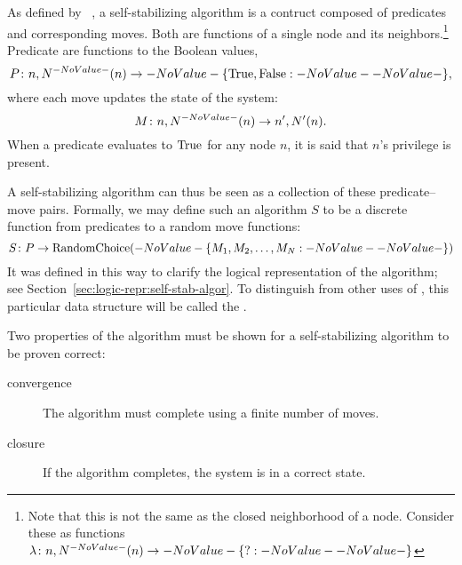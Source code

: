 As defined by \citeauthor{dew:sem}~\autocite{dew:sem},
  a self-stabilizing algorithm is a contruct composed of
  predicates and corresponding moves.
Both are functions of a single node and its neighbors.\footnote{%
  Note that this is not the same as the closed neighborhood of a node.
  Consider these as functions $\Function{n, \OpenNeighborhood{n}}{\Set ?}$}
Predicate are functions to the Boolean values,
  \begin{equation}
  \label{eq:define-predicate}
  \Function[P]{n, \OpenNeighborhood{n}}{\SetBoolean},
  \end{equation}
  where each move updates the state of the system:
  \begin{equation}
  \label{eq:define-move}
  \Function[M]{n, \OpenNeighborhood{n}}{n^\prime, \OpenNeighborhood[\prime]{n}}.
  \end{equation}
When a predicate evaluates to $\text{True}$ for any node $n$,
  it is said that $n$'s privilege is present.

A self-stabilizing algorithm can thus be seen as
  a collection of these predicate--move pairs.
Formally, we may define such an algorithm $S$ to be a discrete function
  from predicates to a random move functions:
  \begin{equation}
    \label{eq:define-ssalg}
    \Function[S]{P}{\operatorname{RandomChoice}(\Set{M_1, M_2, \dots, M_N})}
  \end{equation}
It was defined in this way to clarify the logical representation of the algorithm;
  see Section~\ref{sec:logic-repr:self-stab-algor}.
To distinguish from other uses of ,
  this particular data structure will be called the .

Two properties of the algorithm must be shown
  for a self-stabilizing algorithm to be proven correct:~\autocite{arora:closure-and-convergence}
\begin{description}
\item[convergence] The algorithm must complete using a finite number of moves.
\item[closure] If the algorithm completes, the system is in a correct state.
\end{description}

